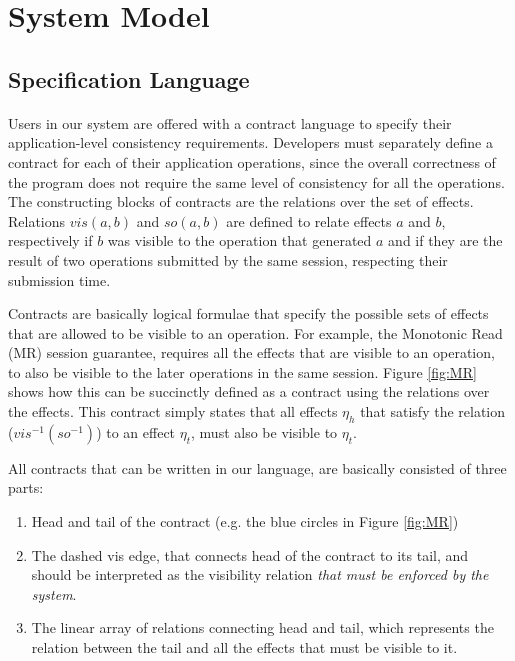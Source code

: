 \section{System Model}
\subsection {Specification Language}



\paragraph* {} Users in our system are offered with a contract language to specify their application-level consistency requirements. 
Developers must separately define a  contract for each of their application operations, since the overall correctness of the program does not require the same level of consistency for all the operations.
The constructing blocks of contracts are the relations over the set of effects. Relations $vis(a,b)$ and $so(a,b)$ are defined to relate effects $a$ and $b$, respectively if $b$ was visible to the operation that generated $a$ and if they are the result of two operations submitted by the same session, respecting their submission time. 


Contracts are basically logical formulae that specify the possible sets of effects that are allowed to be visible to an operation. For example, the Monotonic Read (MR) session guarantee, requires all the effects that are visible to an operation, to also be visible to the later operations in the same session. Figure \ref {fig:MR} shows how this can be succinctly defined as a contract using the relations over the effects. This contract simply states that all effects $\eta_h$ that satisfy the relation ($vis^{-1} (so^{-1})$) to an effect $\eta_t$, must also be visible to $\eta_t$. 


All contracts that can be written in our language, are basically consisted of three parts:
\begin{enumerate}
  \item Head and tail of the contract (e.g. the blue circles in Figure \ref {fig:MR})
  \item The dashed vis edge, that connects head of the contract to its tail, and should be interpreted as the visibility relation \emph{that must be enforced by the system}. 
  \item The linear array of relations connecting head and tail, which represents the relation between the tail and all the effects that must be visible to it.  
\end{enumerate}


